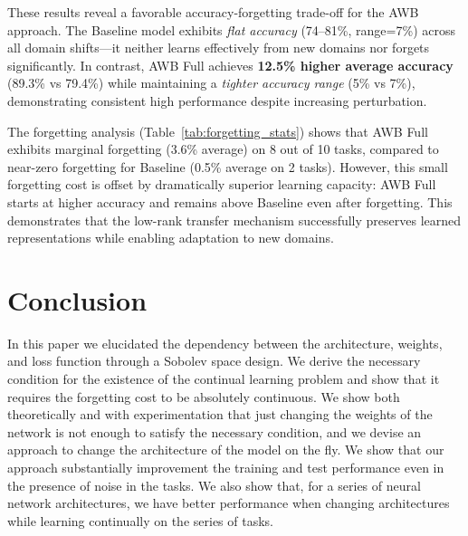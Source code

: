 These results reveal a favorable accuracy-forgetting trade-off for the AWB approach. The Baseline model exhibits \emph{flat accuracy} (74--81\%, range=7\%) across all domain shifts---it neither learns effectively from new domains nor forgets significantly. In contrast, AWB Full achieves \textbf{12.5\% higher average accuracy} (89.3\% vs 79.4\%) while maintaining a \emph{tighter accuracy range} (5\% vs 7\%), demonstrating consistent high performance despite increasing perturbation.

The forgetting analysis (Table~\ref{tab:forgetting_stats}) shows that AWB Full exhibits marginal forgetting (3.6\% average) on 8 out of 10 tasks, compared to near-zero forgetting for Baseline (0.5\% average on 2 tasks). However, this small forgetting cost is offset by dramatically superior learning capacity: AWB Full starts at higher accuracy and remains above Baseline even after forgetting. This demonstrates that the low-rank transfer mechanism successfully preserves learned representations while enabling adaptation to new domains.


\section{Conclusion}
In this paper we elucidated the dependency between the architecture, weights, and  loss function through a Sobolev space design. We derive the necessary condition for the existence of the continual learning problem and show that it requires the forgetting cost to be absolutely continuous. We show both theoretically and with experimentation that just changing the weights of the network is not enough to satisfy the necessary condition, and we devise an approach to change the architecture of the model on the fly. We show  that  our approach  substantially improvement the training and test performance even in the presence of noise in the tasks. We  also  show that, for a series of neural network architectures, we have better performance when changing architectures while learning continually on the series of tasks. 

